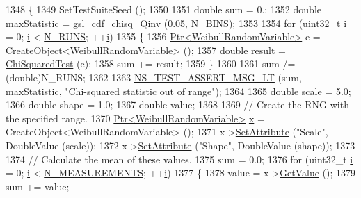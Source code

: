 \begin{DoxyCode}
1348 \{
1349   SetTestSuiteSeed ();
1350 
1351   \textcolor{keywordtype}{double} sum = 0.;
1352   \textcolor{keywordtype}{double} maxStatistic = gsl\_cdf\_chisq\_Qinv (0.05, \hyperlink{classRandomVariableStreamWeibullTestCase_ab240f1ad374ca6d998a4a720c619cc2d}{N\_BINS});
1353 
1354   \textcolor{keywordflow}{for} (uint32\_t \hyperlink{bernuolliDistribution_8m_a6f6ccfcf58b31cb6412107d9d5281426}{i} = 0; \hyperlink{bernuolliDistribution_8m_a6f6ccfcf58b31cb6412107d9d5281426}{i} < \hyperlink{classRandomVariableStreamWeibullTestCase_a898888ac45565faf424bc30c07cb5131}{N\_RUNS}; ++\hyperlink{bernuolliDistribution_8m_a6f6ccfcf58b31cb6412107d9d5281426}{i})
1355     \{
1356       \hyperlink{classns3_1_1Ptr}{Ptr<WeibullRandomVariable>} e = CreateObject<WeibullRandomVariable> ();
1357       \textcolor{keywordtype}{double} result = \hyperlink{classRandomVariableStreamWeibullTestCase_afadfd7f8dc8fdd6423ca1f3a73d83d3e}{ChiSquaredTest} (e);
1358       sum += result;
1359     \}
1360 
1361   sum /= (double)N\_RUNS;
1362 
1363   \hyperlink{group__testing_ga1d96848b91407c9a0b36583e8b0ad7ae}{NS\_TEST\_ASSERT\_MSG\_LT} (sum, maxStatistic, \textcolor{stringliteral}{"Chi-squared statistic out of range"});
1364 
1365   \textcolor{keywordtype}{double} scale = 5.0;
1366   \textcolor{keywordtype}{double} shape = 1.0;
1367   \textcolor{keywordtype}{double} value;
1368 
1369   \textcolor{comment}{// Create the RNG with the specified range.}
1370   \hyperlink{classns3_1_1Ptr}{Ptr<WeibullRandomVariable>} \hyperlink{lte__link__budget__x2__handover__measures_8m_a9336ebf25087d91c818ee6e9ec29f8c1}{x} = CreateObject<WeibullRandomVariable> ();
1371   x->\hyperlink{classns3_1_1ObjectBase_ac60245d3ea4123bbc9b1d391f1f6592f}{SetAttribute} (\textcolor{stringliteral}{"Scale"}, DoubleValue (scale));
1372   x->\hyperlink{classns3_1_1ObjectBase_ac60245d3ea4123bbc9b1d391f1f6592f}{SetAttribute} (\textcolor{stringliteral}{"Shape"}, DoubleValue (shape));
1373 
1374   \textcolor{comment}{// Calculate the mean of these values.}
1375   sum = 0.0;
1376   \textcolor{keywordflow}{for} (uint32\_t \hyperlink{bernuolliDistribution_8m_a6f6ccfcf58b31cb6412107d9d5281426}{i} = 0; \hyperlink{bernuolliDistribution_8m_a6f6ccfcf58b31cb6412107d9d5281426}{i} < \hyperlink{classRandomVariableStreamWeibullTestCase_a1f058dd1e083f78a0912c228cd1753bc}{N\_MEASUREMENTS}; ++\hyperlink{bernuolliDistribution_8m_a6f6ccfcf58b31cb6412107d9d5281426}{i})
1377     \{
1378       value = x->\hyperlink{classns3_1_1WeibullRandomVariable_af64818134b6b7734f33a81bca8d15023}{GetValue} ();
1379       sum += value;

\end{DoxyCode}
